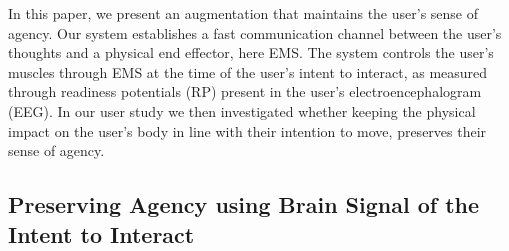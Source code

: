 In this paper, we present an augmentation that maintains the user's sense of agency. Our system establishes a fast communication channel between the user's thoughts and a physical end effector, here EMS. The system controls the user's muscles through EMS at the time of the user's intent to interact, as measured through readiness potentials (RP) present in the user's electroencephalogram (EEG). In our user study we then investigated whether keeping the physical impact on the user's body in line with their intention to move, preserves their sense of agency.

\subsection{Preserving Agency using Brain Signal of the Intent to Interact}


